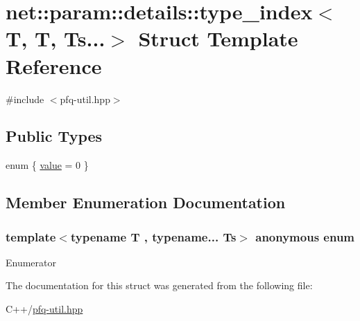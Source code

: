 \hypertarget{structnet_1_1param_1_1details_1_1type__index_3_01T_00_01T_00_01Ts_8_8_8_4}{\section{net\+:\+:param\+:\+:details\+:\+:type\+\_\+index$<$ T, T, Ts...$>$ Struct Template Reference}
\label{structnet_1_1param_1_1details_1_1type__index_3_01T_00_01T_00_01Ts_8_8_8_4}
}


{\ttfamily \#include $<$pfq-\/util.\+hpp$>$}

\subsection*{Public Types}
\begin{DoxyCompactItemize}
\item 
enum \{ \hyperlink{structnet_1_1param_1_1details_1_1type__index_3_01T_00_01T_00_01Ts_8_8_8_4_a040ee215ab90caaa7c12ce856e2d2b2eac990fbaa04445effd47d0e46691f994e}{value} = 0
 \}
\end{DoxyCompactItemize}


\subsection{Member Enumeration Documentation}
\hypertarget{structnet_1_1param_1_1details_1_1type__index_3_01T_00_01T_00_01Ts_8_8_8_4_a040ee215ab90caaa7c12ce856e2d2b2e}{\subsubsection[{anonymous enum}]{\setlength{\rightskip}{0pt plus 5cm}template$<$typename T , typename... Ts$>$ anonymous enum}}\label{structnet_1_1param_1_1details_1_1type__index_3_01T_00_01T_00_01Ts_8_8_8_4_a040ee215ab90caaa7c12ce856e2d2b2e}
\begin{Desc}
\item[Enumerator]\par
\begin{description}
\item[{\em 
\hypertarget{structnet_1_1param_1_1details_1_1type__index_3_01T_00_01T_00_01Ts_8_8_8_4_a040ee215ab90caaa7c12ce856e2d2b2eac990fbaa04445effd47d0e46691f994e}{value}\label{structnet_1_1param_1_1details_1_1type__index_3_01T_00_01T_00_01Ts_8_8_8_4_a040ee215ab90caaa7c12ce856e2d2b2eac990fbaa04445effd47d0e46691f994e}
}]\end{description}
\end{Desc}


The documentation for this struct was generated from the following file\+:\begin{DoxyCompactItemize}
\item 
C++/\hyperlink{pfq-util_8hpp}{pfq-\/util.\+hpp}\end{DoxyCompactItemize}
